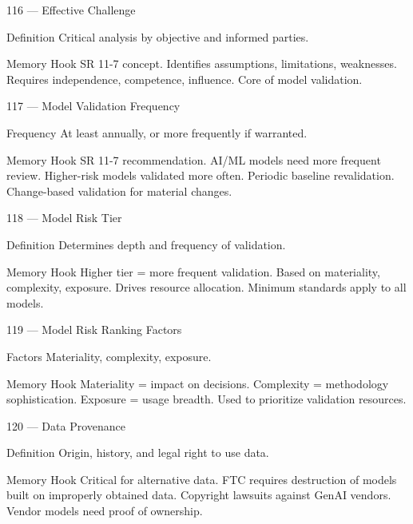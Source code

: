 \documentclass[aspectratio=169,8pt]{beamer}
\begin{document}
	\begin{frame}{116 --- Effective Challenge}
		\begin{block}{Definition}
			Critical analysis by objective and informed parties.
		\end{block}
		\begin{block}{Memory Hook}
			SR 11-7 concept. Identifies assumptions, limitations, weaknesses. Requires independence, competence, influence. Core of model validation.
		\end{block}
	\end{frame}
	
	\begin{frame}{117 --- Model Validation Frequency}
		\begin{block}{Frequency}
			At least annually, or more frequently if warranted.
		\end{block}
		\begin{block}{Memory Hook}
			SR 11-7 recommendation. AI/ML models need more frequent review. Higher-risk models validated more often. Periodic baseline revalidation. Change-based validation for material changes.
		\end{block}
	\end{frame}
	
	\begin{frame}{118 --- Model Risk Tier}
		\begin{block}{Definition}
			Determines depth and frequency of validation.
		\end{block}
		\begin{block}{Memory Hook}
			Higher tier = more frequent validation. Based on materiality, complexity, exposure. Drives resource allocation. Minimum standards apply to all models.
		\end{block}
	\end{frame}
	
	\begin{frame}{119 --- Model Risk Ranking Factors}
		\begin{block}{Factors}
			Materiality, complexity, exposure.
		\end{block}
		\begin{block}{Memory Hook}
			Materiality = impact on decisions. Complexity = methodology sophistication. Exposure = usage breadth. Used to prioritize validation resources.
		\end{block}
	\end{frame}
	
	\begin{frame}{120 --- Data Provenance}
		\begin{block}{Definition}
			Origin, history, and legal right to use data.
		\end{block}
		\begin{block}{Memory Hook}
			Critical for alternative data. FTC requires destruction of models built on improperly obtained data. Copyright lawsuits against GenAI vendors. Vendor models need proof of ownership.
		\end{block}
	\end{frame}
	
\end{document}
